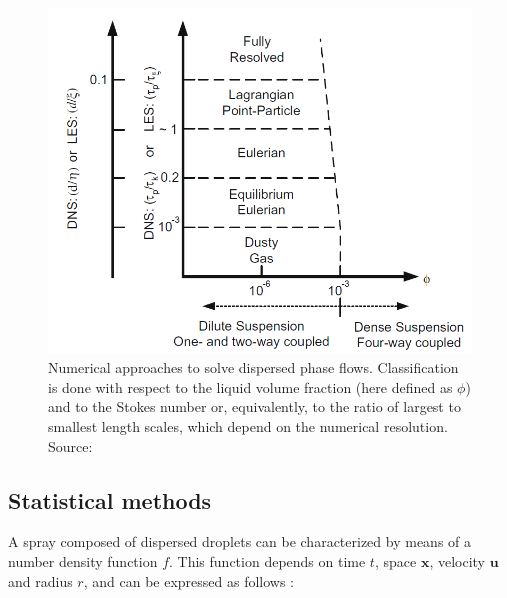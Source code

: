 \begin{figure}[h!]
	\centering
	\includegraphics[scale=0.6]{./part1_numerical_approaches/figures_ch3/balachandar_disperse_phase_classification}
	\caption[Numerical approaches to solve dispersed phase flows]{Numerical approaches to solve dispersed phase flows. Classification is done with respect to the liquid volume fraction (here defined as $\phi$) and to the Stokes number or, equivalently, to the ratio of largest to smallest length scales, which depend on the numerical resolution.  Source: }
	\label{fig:balachandar_numerical_methods_representation}
\end{figure}



\subsection{Statistical methods}
\label{subsec:ch3_statistical_methods}

A spray composed of dispersed droplets can be characterized by means of a number density function $f$. This function depends on time $t$, space $\textbf{x}$, velocity $\textbf{u}$ and radius $r$, and can be expressed as follows :

